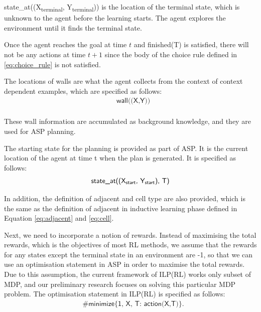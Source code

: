 \textsf{state\_at((X\textsubscript{terminal}, Y\textsubscript{terminal}))} is the location of the terminal state, which is unknown to the agent before the learning starts.
The agent explores the environment until it finds the terminal state.

Once the agent reaches the goal at time $t$ and \textsf{finished(T)} is satisfied, 
there will not be any actions at time $t+1$ since the body of the choice rule defined in \ref{eq:choice_rule} is not satisfied.

The locations of walls are what the agent collects from the context of context dependent examples, which are specified as follows:
\begin{equation}
\begin{split}
&\textsf{wall((X,Y))}\\
\end{split}
\end{equation}
 
These wall information are accumulated as background knowledge, and they are used for ASP planning. 

The starting state for the planning is provided as part of ASP. It is the current location of the agent at time t when the plan is generated. It is specified as follows:
\begin{equation}
\begin{split}
\textsf{state\_at((X\textsubscript{start}, Y\textsubscript{start}), T)}
\end{split}
\end{equation}

In addition, the definition of adjacent and cell type are also provided, which is the same as the definition of adjacent in inductive learning phase defined in Equation \ref{eq:adjacent} and \ref{eq:cell}.

Next, we need to incorporate a notion of rewards. Instead of maximising the total rewards, which is the objectives of most RL methods, we assume that the rewards for any states except the terminal state in an environment are -1, so that we can use
an optimisation statement in ASP in order to maximise the total rewards. Due to this assumption, the current framework of ILP(RL) works only subset of MDP, and our preliminary research focuses on solving this particular MDP problem. 
The optimisation statement in ILP(RL) is specified as follows: 
\begin{equation}
\begin{split}
&\textsf{\#minimize\{1, X, T: action(X,T)\}}.
\end{split}
\end{equation}

